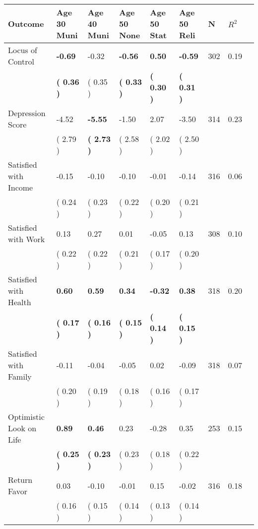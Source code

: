 \begin{tabular}{L{6.2cm} C{1.8cm} C{1.8cm} C{1.8cm} C{1.8cm} C{1.8cm} C{1.8cm} C{0.3cm} C{0.3cm}}
\toprule
 \textbf{Outcome} & \textbf{Age 30 Muni} & \textbf{Age 40 Muni} & \textbf{Age 50 None} & \textbf{Age 50 Stat} & \textbf{Age 50 Reli} & \textbf{N} & \textbf{$ R^2$} \\
\midrule
Locus of Control & \textbf{    -0.69} &     -0.32 & \textbf{    -0.56} & \textbf{     0.50} & \textbf{    -0.59}  & 302 &       0.19 \\ 
 & \textbf{(     0.36 )} & (     0.35 ) & \textbf{(     0.33 )} & \textbf{(     0.30 )} & \textbf{(     0.31 )}  & \\
Depression Score &     -4.52 & \textbf{    -5.55} &     -1.50 &      2.07 &     -3.50  & 314 &       0.23 \\ 
 & (     2.79 ) & \textbf{(     2.73 )} & (     2.58 ) & (     2.02 ) & (     2.50 )  & \\
Satisfied with Income &     -0.15 &     -0.10 &     -0.10 &     -0.01 &     -0.14  & 316 &       0.06 \\ 
 & (     0.24 ) & (     0.23 ) & (     0.22 ) & (     0.20 ) & (     0.21 )  & \\
Satisfied with Work &      0.13 &      0.27 &      0.01 &     -0.05 &      0.13  & 308 &       0.10 \\ 
 & (     0.22 ) & (     0.22 ) & (     0.21 ) & (     0.17 ) & (     0.20 )  & \\
Satisfied with Health & \textbf{     0.60} & \textbf{     0.59} & \textbf{     0.34} & \textbf{    -0.32} & \textbf{     0.38}  & 318 &       0.20 \\ 
 & \textbf{(     0.17 )} & \textbf{(     0.16 )} & \textbf{(     0.15 )} & \textbf{(     0.14 )} & \textbf{(     0.15 )}  & \\
Satisfied with Family &     -0.11 &     -0.04 &     -0.05 &      0.02 &     -0.09  & 318 &       0.07 \\ 
 & (     0.20 ) & (     0.19 ) & (     0.18 ) & (     0.16 ) & (     0.17 )  & \\
Optimistic Look on Life & \textbf{     0.89} & \textbf{     0.46} &      0.23 &     -0.28 &      0.35  & 253 &       0.15 \\ 
 & \textbf{(     0.25 )} & \textbf{(     0.23 )} & (     0.23 ) & (     0.18 ) & (     0.22 )  & \\
Return Favor &      0.03 &     -0.10 &     -0.01 &      0.15 &     -0.02  & 316 &       0.18 \\ 
 & (     0.16 ) & (     0.15 ) & (     0.14 ) & (     0.13 ) & (     0.14 )  & \\

\end{tabular}

